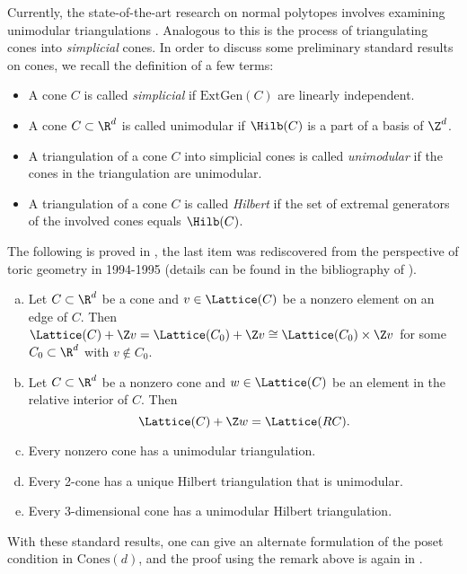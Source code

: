 \documentclass{TC}
\begin{document}
Currently, the state-of-the-art research on normal polytopes involves examining unimodular triangulations \cite{haase_paffenholz_andreas_piechnik_lindsay_santos_francisco_2017}. Analogous to this is the process of triangulating cones into \emph{simplicial} cones. In order to discuss some preliminary standard results on cones, we recall the definition of a few terms:
\begin{itemize}
\item A cone $C$ is called \emph{simplicial} if $\mathrm{ExtGen}(C)$ are linearly independent.
\item A cone $C \subset \R^d$ is called unimodular if $\Hilb(C)$ is a part of a basis of $\Z^d$.
\item A triangulation of a cone $C$ into simplicial cones is called \emph{unimodular} if the cones in the triangulation are unimodular.
\item A triangulation of a cone $C$ is called \emph{Hilbert} if the set of extremal generators of the involved cones equals $\Hilb(C)$.
\end{itemize}

The following is proved in \cite{GubeladzePolytopesRingsKtheory}, the last item was rediscovered from the perspective of toric geometry in 1994-1995 (details can be found in the bibliography of \cite{GubeladzePosetCones}).

\begin{lemma}
\hfill
\begin{enumerate}[(a)]
\item Let $C \subset \R^d$ be a cone and $v \in \Lattice(C)$ be a nonzero element on an edge of $C$. Then $\Lattice(C) + \Z v = \Lattice(C_0) + \Z v  \cong \Lattice(C_0) \times \Z v$ for some $C_0 \subset \R^d$ with $v \notin C_0$.
\item Let $C \subset \R^d$ be a nonzero cone and $w \in \Lattice(C)$ be an element in the relative interior of $C$. Then $$\Lattice(C) + \Z w = \Lattice(RC).$$
\item Every nonzero cone has a unimodular triangulation.
\item Every 2-cone has a unique Hilbert triangulation that is unimodular.
\item Every 3-dimensional cone has a unimodular Hilbert triangulation. 
\end{enumerate}
\end{lemma}

With these standard results, one can give an alternate formulation of the poset condition in $\mathrm{Cones}(d)$, and the proof using the remark above is again in \cite{GubeladzePosetCones} .
\end{document}
